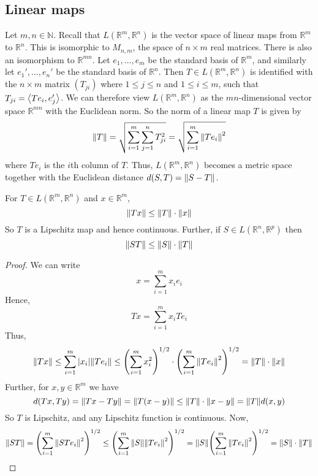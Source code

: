 \subsection{Linear maps}
Let \( m, n \in \mathbb N \).
Recall that \( L(\mathbb R^m, \mathbb R^n) \) is the vector space of linear maps from \( \mathbb R^m \) to \( \mathbb R^n \).
This is isomorphic to \( M_{n,m} \), the space of \( n \times m \) real matrices.
There is also an isomorphism to \( \mathbb R^{mn} \).
Let \( e_1, \dots, e_m \) be the standard basis of \( \mathbb R^m \), and similarly let \( e_1', \dots, e_n' \) be the standard basis of \( \mathbb R^n \).
Then \( T \in L(\mathbb R^m, \mathbb R^n) \) is identified with the \( n \times m \) matrix \( (T_{ji}) \) where \( 1 \leq j \leq n \) and \( 1 \leq i \leq m \), such that \( T_{ji} = \left\langle{T e_i, e_j'}\right\rangle \).
We can therefore view \( L(\mathbb R^m, \mathbb R^n) \) as the \( mn \)-dimensional vector space \( \mathbb R^{mn} \) with the Euclidean norm.
So the norm of a linear map \( T \) is given by
\[
	\norm{T} = \sqrt{\sum_{i=1}^m \sum_{j=1}^n T_{ji}^2} = \sqrt{\sum_{i=1}^m \norm{Te_i}^2}
\]
where \( T e_i \) is the \( i \)th column of \( T \).
Thus, \( L(\mathbb R^m, \mathbb R^n) \) becomes a metric space together with the Euclidean distance \( d(S,T) = \norm{S-T} \).
\begin{lemma}
	For \( T \in L(\mathbb R^m, \mathbb R^n) \) and \( x \in \mathbb R^m \),
	\[
		\norm{Tx} \leq \norm{T} \cdot \norm{x}
	\]
	So \( T \) is a Lipschitz map and hence continuous.
	Further, if \( S \in L(\mathbb R^n, \mathbb R^p) \) then
	\[
		\norm{ST} \leq \norm{S} \cdot \norm{T}
	\]
\end{lemma}
\begin{proof}
	We can write
	\[
		x = \sum_{i=1}^m x_i e_i
	\]
	Hence,
	\[
		Tx = \sum_{i=1}^m x_i T e_i
	\]
	Thus,
	\[
		\norm{Tx} \leq \sum_{i=1}^m \abs{x_i} \norm{T e_i} \leq \qty(\sum_{i=1}^m x_i^2)^{1/2} \cdot \qty(\sum_{i=1}^m \norm{Te_i}^2)^{1/2} = \norm{T} \cdot \norm{x}
	\]
	Further, for \( x,y \in \mathbb R^m \) we have
	\[
		d(Tx, Ty) = \norm{Tx - Ty} = \norm{T(x-y)} \leq \norm{T} \cdot \norm{x-y} = \norm{T} d(x,y)
	\]
	So \( T \) is Lipschitz, and any Lipschitz function is continuous.
	Now,
	\[
		\norm{ST} = \qty(\sum_{i=1}^m \norm{STe_i}^2)^{1/2} \leq \qty(\sum_{i=1}^m \norm{S} \norm{Te_i}^2)^{1/2} = \norm{S} \qty(\sum_{i=1}^m \norm{Te_i}^2)^{1/2} = \norm{S} \cdot \norm{T}
	\]
\end{proof}

